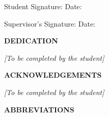 \documentclass[12pt,a4paper]{article}
\begin{document}
\noindent Student Signature: \dotfill Date: \dotfill

\vspace{2cm}

\noindent Supervisor's Signature: \dotfill Date: \dotfill

\newpage

\thispagestyle{empty}

\begin{center}
{\Large\bfseries DEDICATION}
\end{center}

\vspace{2cm}

\textit{[To be completed by the student]}

\newpage

\thispagestyle{empty}

\begin{center}
{\Large\bfseries ACKNOWLEDGEMENTS}
\end{center}

\vspace{1.5cm}

\textit{[To be completed by the student]}

\newpage

\thispagestyle{empty}

\begin{center}
{\Large\bfseries ABBREVIATIONS}
\end{center}

\vspace{1cm}
\end{document}
